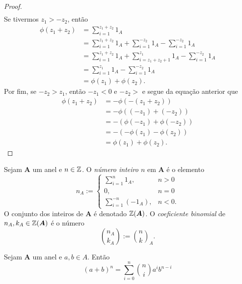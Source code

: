 \begin{proof}
\begin{align*}
	\end{align*}
Se tivermos $z_1>-z_2$, então
	\begin{align*}
	\phi(z_1+z_2) &= \sum_{i=1}^{z_1+z_2} 1_A \\
		&= \sum_{i=1}^{z_1+z_2} 1_A + \sum_{i=1}^{-z_2} 1_A - \sum_{i=1}^{-z_2} 1_A \\
		&= \sum_{i=1}^{z_1+z_2} 1_A + \sum_{i=z_1+z_2+1}^{z_1} 1_A - \sum_{i=1}^{-z_2} 1_A \\
		&= \sum_{i=1}^{z_1} 1_A - \sum_{i=1}^{-z_2} 1_A \\
		&= \phi(z_1)+\phi(z_2).
	\end{align*}
Por fim, se $-z_2>z_1$, então $-z_1<0$ e $-z_2>$ e segue da equação anterior que
	\begin{align*}
	\phi(z_1+z_2) &= -\phi(-(z_1+z_2)) \\
		&= -\phi((-z_1)+(-z_2)) \\
		&= -(\phi(-z_1)+\phi(-z_2)) \\
		&= -(-\phi(z_1)-\phi(z_2)) \\
		&= \phi(z_1)+\phi(z_2).
	\end{align*}
\end{proof}

\begin{defi}
Sejam $\bm A$ um anel e $n \in \mathbb{Z}$. O \emph{número inteiro $n$} em $\bm A$ é o elemento
	\begin{equation*}
	n_A := \begin{cases}
		\sum_{i=1}^{n} 1_A,& n>0 \\
		0,& n=0 \\
		\sum_{i=1}^{-n} (-1_A),& n<0.
	\end{cases}
	\end{equation*}
O conjunto dos inteiros de $\bm A$ é denotado $\mathbb{Z}(\bm A)$.
O \emph{coeficiente binomial} de $n_A,k_A \in \mathbb{Z}(\bm A)$ é o número
	\begin{equation*}
	\binom{n_A}{k_A} := \binom{n}{k}_A.
	\end{equation*}
\end{defi}

\begin{prop}
Sejam $\bm A$ um anel e $a,b \in A$. Então
	\begin{equation*}
	(a+b)^n = \sum_{i=0}^n \binom{n}{i} a^i b^{n-i}
	\end{equation*}
\end{prop}

